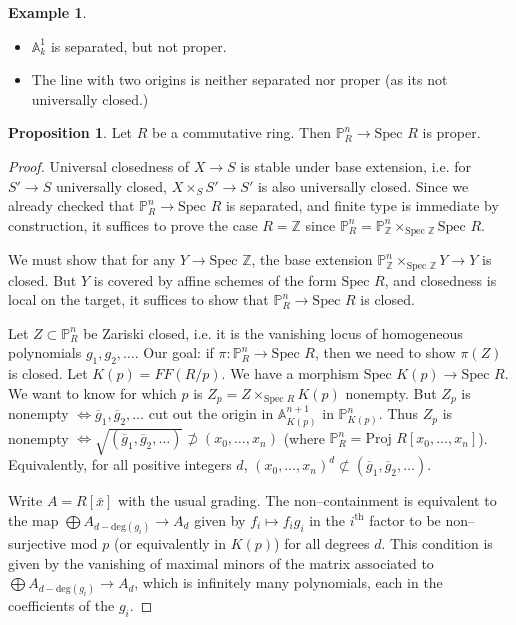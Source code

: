 \documentclass{article}
\theoremstyle{definition}
\newtheorem{prop}[theorem]{Proposition}
\newtheorem{example}{Example}[section]
\begin{document}
\begin{example}
    \begin{itemize}
        \item $\mathbb{A}_k^1$ is separated, but not proper.
        \item The line with two origins is neither separated nor proper (as its not universally closed.)
    \end{itemize}
\end{example}
\begin{prop}
    Let $R$ be a commutative ring. Then $\mathbb{P}_R^n \to \text{Spec }R$ is proper.
\end{prop} 
\begin{proof}
    Universal closedness of $X \to S$ is stable under base extension, i.e. for $S' \to S$ universally closed, $X \times_S S' \to S'$ is also universally closed. Since we already checked that $\mathbb{P}^n_R \to \text{Spec }R$ is separated, and finite type is immediate by construction, it suffices to prove the case $R = \mathbb{Z}$ since $\mathbb{P}^n_R = \mathbb{P}^n_\mathbb{Z} \times_{\text{Spec }\mathbb{Z}} \text{Spec }R$.
    \vspace{1mm}
     
    We must show that for any $Y \to \text{Spec }\mathbb{Z}$, the base extension $\mathbb{P}^n_\mathbb{Z} \times_{\text{Spec }\mathbb{Z}} Y \to Y$ is closed. But $Y$ is covered by affine schemes of the form $\text{Spec }R$, and closedness is local on the target, it suffices to show that $\mathbb{P}^n_R \to \text{Spec }R$ is closed.
    
    Let $Z \subset \mathbb{P}^n_R$ be Zariski closed, i.e. it is the vanishing locus of homogeneous polynomials $g_1,g_2,\ldots$. Our goal: if $\pi: \mathbb{P}^n_R \to \text{Spec }R$, then we need to show $\pi(Z)$ is closed. Let $K(p) = FF(R/p)$. We have a morphism $\text{Spec }K(p) \to \text{Spec }R$. We want to know for which $p$ is $Z_p = Z \times_{\text{Spec }R} K(p)$ nonempty. But $Z_p$ is nonempty $\iff \overline{g}_1, \overline{g}_2,\ldots$ cut out the origin in $\mathbb{A}^{n+1}_{K(p)}$ in $\mathbb{P}^n_{K(p)}$. Thus $Z_p$ is nonempty $\iff \sqrt{(\overline{g}_1,\overline{g}_2,\ldots)} \not\supset (x_0,\ldots,x_n)$ (where $\mathbb{P}^n_R = \text{Proj }R[x_0,\ldots,x_n]$). Equivalently, for all positive integers $d$, $(x_0,\ldots,x_n)^d \not\subset (\overline{g}_1,\overline{g}_2,\ldots)$. 
    \vspace{1mm}
     
    Write $A = R[\overline{x}]$ with the usual grading. The non--containment is equivalent to the map $\bigoplus A_{d-\text{deg}(g_i)} \to A_d$ given by $f_i \mapsto f_i g_i$ in the $i^{\text{th}}$ factor to be non--surjective mod $p$ (or equivalently in $K(p)$) for all degrees $d$. This condition is given by the vanishing of maximal minors of the matrix associated to $\bigoplus A_{d-\text{deg}(g_i)} \to A_d$, which is infinitely many polynomials, each in the coefficients of the $g_i$.
\end{proof}
\end{document}
